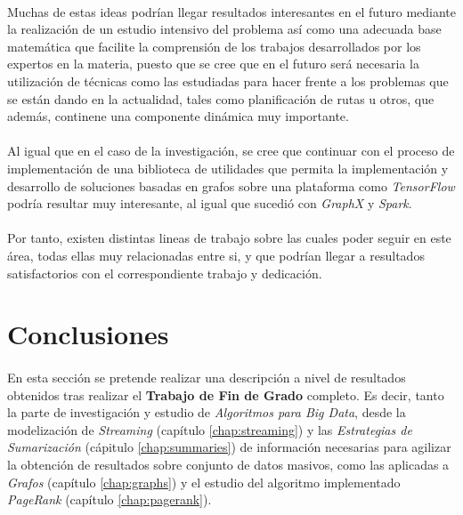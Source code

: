 \documentclass{subfiles}
\begin{document}
      \paragraph{}
      Muchas de estas ideas podrían llegar resultados interesantes en el futuro mediante la realización de un estudio intensivo del problema así como una adecuada base matemática que facilite la comprensión de los trabajos desarrollados por los expertos en la materia, puesto que se cree que en el futuro será necesaria la utilización de técnicas como las estudiadas para hacer frente a los problemas que se están dando en la actualidad, tales como planificación de rutas u otros, que además, continene una componente dinámica muy importante.

      \paragraph{}
      Al igual que en el caso de la investigación, se cree que continuar con el proceso de implementación de una biblioteca de utilidades que permita la implementación y desarrollo de soluciones basadas en grafos sobre una plataforma como \emph{TensorFlow} podría resultar muy interesante, al igual que sucedió con \emph{GraphX} y \emph{Spark}.

      \paragraph{}
      Por tanto, existen distintas lineas de trabajo sobre las cuales poder seguir en este área, todas ellas muy relacionadas entre si, y que podrían llegar a resultados satisfactorios con el correspondiente trabajo y dedicación.

    \section{Conclusiones}
    \label{sec:implementation_conclusions}

      \paragraph{}
      En esta sección se pretende realizar una descripción a nivel de resultados obtenidos tras realizar el \textbf{Trabajo de Fin de Grado} completo. Es decir, tanto la parte de investigación y estudio de \emph{Algoritmos para Big Data}, desde la modelización de \emph{Streaming} (capítulo \ref{chap:streaming}) y las \emph{Estrategias de Sumarización} (cápitulo \ref{chap:summaries}) de información necesarias para agilizar la obtención de resultados sobre conjunto de datos masivos, como las aplicadas a \emph{Grafos} (capítulo \ref{chap:graphs}) y el estudio del algoritmo implementado \emph{PageRank} (capítulo \ref{chap:pagerank}).
\end{document}

